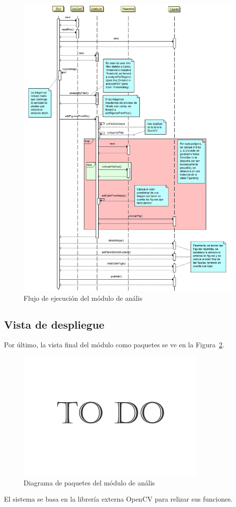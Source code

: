 		\begin{figure}[htbp]
		\centering
		\includegraphics[scale=0.47]{graphics/diagramaflujoPHIC.png}
		\caption{Flujo de ejecución del módulo de anális}
		\label{fig:diagramaflujoPHIC}
		\end{figure}
		
\subsection{Vista de despliegue}
		
Por último, la vista final del módulo como paquetes se ve en la Figura~\ref{fig:diagramapaquetesPHIC}.\\

		\begin{figure}[htbp]
		\centering
		\includegraphics[scale=0.47]{graphics/todo.png}
		\caption{Diagrama de paquetes del módulo de anális}
		\label{fig:diagramapaquetesPHIC}
		\end{figure}
		
El sistema se basa en la librería externa OpenCV para relizar sus funciones.